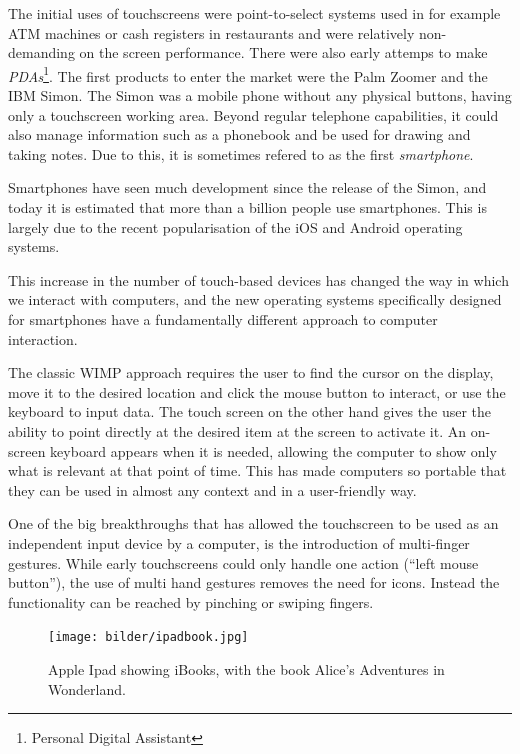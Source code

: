 The initial uses of touchscreens were point-to-select systems used in for example ATM machines or cash registers in restaurants and were relatively non-demanding on the screen performance\cite{buxton}. There were also early attemps to make \emph{PDAs}\footnote{Personal Digital Assistant}. The first products to enter the market were the Palm Zoomer and the IBM Simon. The Simon was a mobile phone without any physical buttons, having only a touchscreen working area. Beyond regular telephone capabilities, it could also manage information such as a phonebook and be used for drawing and taking notes. Due to this, it is sometimes refered to as the first \emph{smartphone}\cite{buxton}.

Smartphones have seen much development since the release of the Simon, and today it is estimated that more than a billion people use smartphones\cite{billion1}\cite{billion2}. This is largely due to the recent popularisation of the iOS and Android operating systems.

This increase in the number of touch-based devices has changed the way in which we interact with computers, and the new operating systems specifically designed for smartphones have a fundamentally different approach to computer interaction.

The classic WIMP approach requires the user to find the cursor on the display, move it to the desired location and click the mouse button to interact, or use the keyboard to input data. The touch screen on the other hand gives the user the ability to point directly at the desired item at the screen to activate it. An on-screen keyboard appears when it is needed, allowing the computer to show only what is relevant at that point of time. This has made computers so portable that they can be used in almost any context and in a user-friendly way.

One of the big breakthroughs that has allowed the touchscreen to be used as an independent input device by a computer, is the introduction of multi-finger gestures. While early touchscreens could only handle one action (``left mouse button''), the use of multi hand gestures removes the need for icons. Instead the functionality can be reached by pinching or swiping fingers.

\begin{figure}[]
\texttt{[image: bilder/ipadbook.jpg]}
\caption{Apple Ipad showing iBooks, with the book Alice's Adventures in Wonderland.}
\label{ibooks}
\end{figure}
\nocite{ipadbook}

